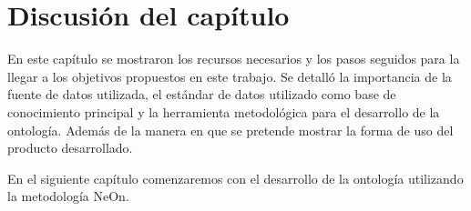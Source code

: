 %

\section{Discusión del capítulo}

En este capítulo se mostraron los recursos necesarios y los pasos seguidos para la llegar a los objetivos propuestos en este trabajo. Se detalló la importancia de la fuente de datos utilizada, el estándar de datos utilizado como base de conocimiento principal y la herramienta metodológica para el desarrollo de la ontología. Además de la manera en que se pretende mostrar la forma de uso del producto desarrollado.

En el siguiente capítulo comenzaremos con el desarrollo de la ontología utilizando la metodología NeOn.




